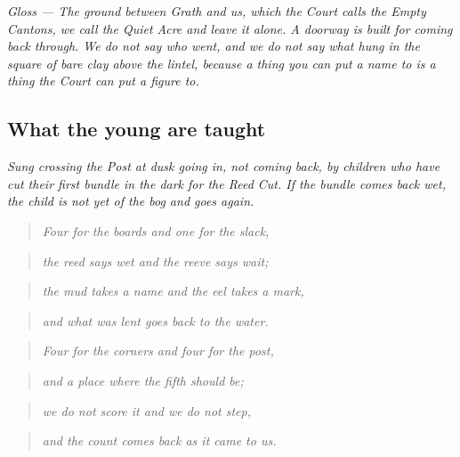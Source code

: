 \documentclass{design/chronicle}
\begin{document}
\emph{Gloss — The ground between Grath and us, which the Court calls the Empty Cantons, we call the Quiet Acre and leave it alone. A doorway is built for coming back through. We do not say who went, and we do not say what hung in the square of bare clay above the lintel, because a thing you can put a name to is a thing the Court can put a figure to.}

\subsection*{What the young are taught}

\emph{Sung crossing the Post at dusk going in, not coming back, by children who have cut their first bundle in the dark for the Reed Cut. If the bundle comes back wet, the child is not yet of the bog and goes again.}

\begin{quote}\itshape Four for the boards and one for the slack,\end{quote}

\begin{quote}\itshape the reed says wet and the reeve says wait;\end{quote}

\begin{quote}\itshape the mud takes a name and the eel takes a mark,\end{quote}

\begin{quote}\itshape and what was lent goes back to the water.\end{quote}

\begin{quote}\itshape \end{quote}

\begin{quote}\itshape Four for the corners and four for the post,\end{quote}

\begin{quote}\itshape and a place where the fifth should be;\end{quote}

\begin{quote}\itshape we do not score it and we do not step,\end{quote}

\begin{quote}\itshape and the count comes back as it came to us.\end{quote}
\end{document}
